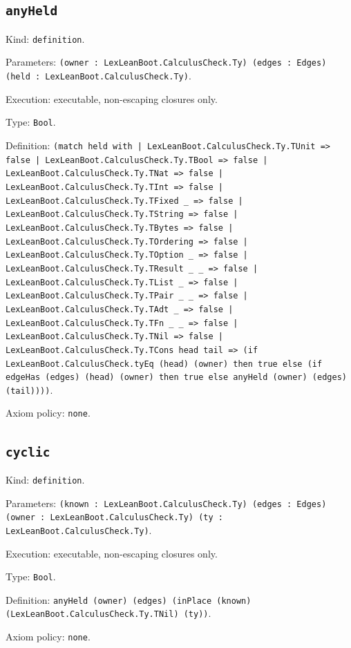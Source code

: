 \documentclass[11pt]{article}
\begin{document}
\subsection*{\texttt{anyHeld}}
\noindent Kind: \texttt{definition}.\par
\noindent Parameters: \texttt{(owner : LexLeanBoot.CalculusCheck.Ty) (edges : Edges) (held : LexLeanBoot.CalculusCheck.Ty)}.\par
\noindent Execution: executable, non-escaping closures only.\par
\noindent Type: \texttt{Bool}.\par
\noindent Definition: \texttt{(match held with | LexLeanBoot.CalculusCheck.Ty.TUnit => false | LexLeanBoot.CalculusCheck.Ty.TBool => false | LexLeanBoot.CalculusCheck.Ty.TNat => false | LexLeanBoot.CalculusCheck.Ty.TInt => false | LexLeanBoot.CalculusCheck.Ty.TFixed \_ => false | LexLeanBoot.CalculusCheck.Ty.TString => false | LexLeanBoot.CalculusCheck.Ty.TBytes => false | LexLeanBoot.CalculusCheck.Ty.TOrdering => false | LexLeanBoot.CalculusCheck.Ty.TOption \_ => false | LexLeanBoot.CalculusCheck.Ty.TResult \_ \_ => false | LexLeanBoot.CalculusCheck.Ty.TList \_ => false | LexLeanBoot.CalculusCheck.Ty.TPair \_ \_ => false | LexLeanBoot.CalculusCheck.Ty.TAdt \_ => false | LexLeanBoot.CalculusCheck.Ty.TFn \_ \_ => false | LexLeanBoot.CalculusCheck.Ty.TNil => false | LexLeanBoot.CalculusCheck.Ty.TCons head tail => (if LexLeanBoot.CalculusCheck.tyEq (head) (owner) then true else (if edgeHas (edges) (head) (owner) then true else anyHeld (owner) (edges) (tail))))}.\par
\noindent Axiom policy: \texttt{none}.\par
\subsection*{\texttt{cyclic}}
\noindent Kind: \texttt{definition}.\par
\noindent Parameters: \texttt{(known : LexLeanBoot.CalculusCheck.Ty) (edges : Edges) (owner : LexLeanBoot.CalculusCheck.Ty) (ty : LexLeanBoot.CalculusCheck.Ty)}.\par
\noindent Execution: executable, non-escaping closures only.\par
\noindent Type: \texttt{Bool}.\par
\noindent Definition: \texttt{anyHeld (owner) (edges) (inPlace (known) (LexLeanBoot.CalculusCheck.Ty.TNil) (ty))}.\par
\noindent Axiom policy: \texttt{none}.\par
\end{document}

